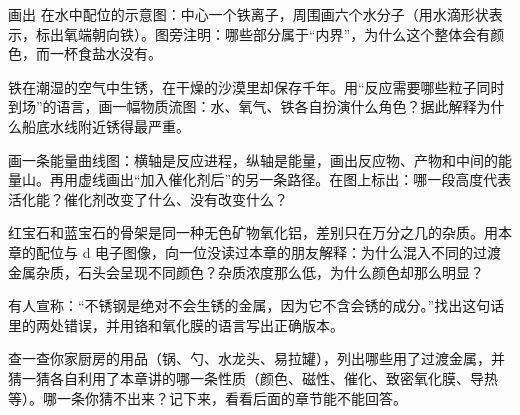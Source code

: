 \begin{sikaoti}
\item 画出  在水中配位的示意图：中心一个铁离子，周围画六个水分子（用水滴形状表示，标出氧端朝向铁）。图旁注明：哪些部分属于“内界”，为什么这个整体会有颜色，而一杯食盐水没有。
\item 铁在潮湿的空气中生锈，在干燥的沙漠里却保存千年。用“反应需要哪些粒子同时到场”的语言，画一幅物质流图：水、氧气、铁各自扮演什么角色？据此解释为什么船底水线附近锈得最严重。
\item 画一条能量曲线图：横轴是反应进程，纵轴是能量，画出反应物、产物和中间的能量山。再用虚线画出“加入催化剂后”的另一条路径。在图上标出：哪一段高度代表活化能？催化剂改变了什么、没有改变什么？
\item 红宝石和蓝宝石的骨架是同一种无色矿物氧化铝，差别只在万分之几的杂质。用本章的配位与 d 电子图像，向一位没读过本章的朋友解释：为什么混入不同的过渡金属杂质，石头会呈现不同颜色？杂质浓度那么低，为什么颜色却那么明显？
\item 有人宣称：“不锈钢是绝对不会生锈的金属，因为它不含会锈的成分。”找出这句话里的两处错误，并用铬和氧化膜的语言写出正确版本。
\item 查一查你家厨房的用品（锅、勺、水龙头、易拉罐），列出哪些用了过渡金属，并猜一猜各自利用了本章讲的哪一条性质（颜色、磁性、催化、致密氧化膜、导热等）。哪一条你猜不出来？记下来，看看后面的章节能不能回答。
\end{sikaoti}
